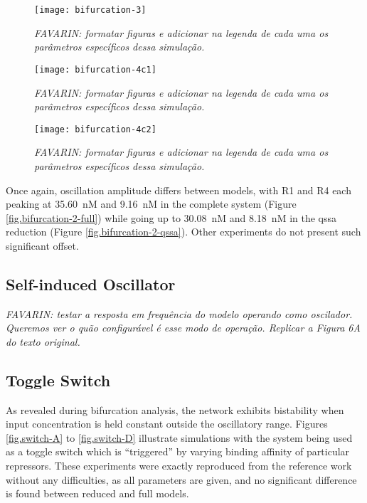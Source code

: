     \begin{figure}[!htbp]
      \centering
      \texttt{[image: bifurcation-3]}
      \caption{\textit{FAVARIN: formatar figuras e adicionar na legenda de cada uma os parâmetros específicos dessa simulação.}}
      \label{fig.bifurcation-3}
    \end{figure}

    \begin{figure}[!htbp]
      \centering
      \texttt{[image: bifurcation-4c1]}
      \caption{\textit{FAVARIN: formatar figuras e adicionar na legenda de cada uma os parâmetros específicos dessa simulação.}}
      \label{fig.bifurcation-4c1}
    \end{figure}

    \begin{figure}[!htbp]
      \centering
      \texttt{[image: bifurcation-4c2]}
      \caption{\textit{FAVARIN: formatar figuras e adicionar na legenda de cada uma os parâmetros específicos dessa simulação.}}
      \label{fig.bifurcation-4c2}
    \end{figure}

    Once again, oscillation amplitude differs between models, with R1 and R4 each peaking at \SI{35.60}{\nano M} and \SI{9.16}{\nano M} in the complete system (Figure \ref{fig.bifurcation-2-full}) while going up to \SI{30.08}{\nano M} and \SI{8.18}{\nano M} in the \ac{qssa} reduction (Figure \ref{fig.bifurcation-2-qssa}).
    Other experiments do not present such significant offset.


  \subsection{Self-induced Oscillator}

    \textit{FAVARIN: testar a resposta em frequência do modelo operando como oscilador.
    Queremos ver o quão configurável é esse modo de operação.
    Replicar a Figura 6A do texto original.}


  \subsection{Toggle Switch}

    As revealed during bifurcation analysis, the network exhibits bistability when input concentration is held constant outside the oscillatory range.
    Figures \ref{fig.switch-A} to \ref{fig.switch-D} illustrate simulations with the system being used as a toggle switch which is ``triggered'' by varying binding affinity of particular repressors.
    These experiments were exactly reproduced from the reference work without any difficulties, as all parameters are given, and no significant difference is found between reduced and full models.

